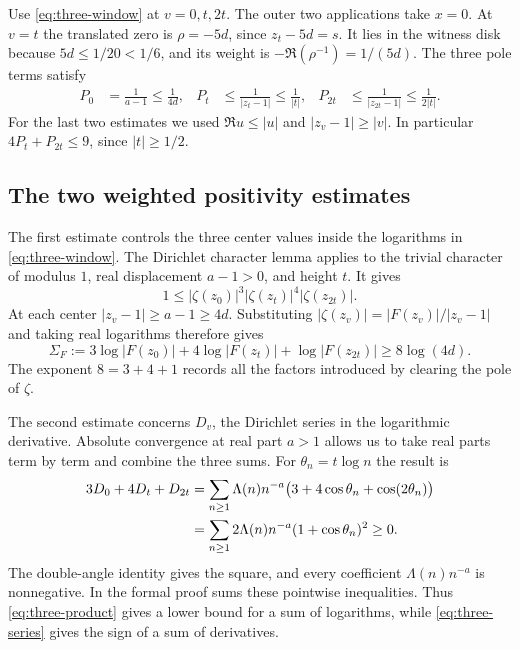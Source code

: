 Use \eqref{eq:three-window} at \(v=0,t,2t\). The outer two applications
take \(x=0\). At \(v=t\) the translated zero is \(\rho=-5d\), since
\(z_t-5d=s\). It lies in the witness disk because \(5d\le1/20<1/6\), and
its weight is \(-\Re(\rho^{-1})=1/(5d)\). The three pole terms satisfy
\begin{align}
 P_0&=\frac{1}{a-1}\le\frac{1}{4d},&
 P_t&\le\frac{1}{|z_t-1|}\le\frac{1}{|t|},&
 P_{2t}&\le\frac{1}{|z_{2t}-1|}\le\frac{1}{2|t|}.
 \label{eq:three-poles}
\end{align}
For the last two estimates we used \(\Re u\le |u|\) and
\(|z_v-1|\ge |v|\). In particular \(4P_t+P_{2t}\le9\), since
\(|t|\ge1/2\).

\subsection{The two weighted positivity estimates}

The first estimate controls the three center values inside the logarithms
in \eqref{eq:three-window}. The Dirichlet character lemma
 applies to the trivial character
of modulus \(1\), real displacement \(a-1>0\), and height \(t\). It gives
\[
       1\le |\zeta(z_0)|^3|\zeta(z_t)|^4|\zeta(z_{2t})|.
\]
At each center \(|z_v-1|\ge a-1\ge4d\).
Substituting \(|\zeta(z_v)|=|F(z_v)|/|z_v-1|\) and taking real
logarithms therefore gives
\begin{equation}
 \Sigma_F:=3\log|F(z_0)|+4\log|F(z_t)|+\log|F(z_{2t})|
             \ge 8\log(4d).
 \label{eq:three-product}
\end{equation}
The exponent \(8=3+4+1\) records all the factors introduced by clearing
the pole of \(\zeta\).

The second estimate concerns \(D_v\), the Dirichlet series in the
logarithmic derivative. Absolute convergence at real part \(a>1\) allows
us to take real parts term by term and combine the three sums. For
\(\theta_n=t\log n\) the result is
\begin{align}
 3D_0+4D_t+D_{2t}
   &=\sum_{n\ge1}\Lambda(n)n^{-a}
           \bigl(3+4\cos\theta_n+\cos(2\theta_n)\bigr)\notag\\
   &=\sum_{n\ge1}2\Lambda(n)n^{-a}(1+\cos\theta_n)^2\ge0 .
 \label{eq:three-series}
\end{align}
The double-angle identity gives the square, and every coefficient
\(\Lambda(n)n^{-a}\) is nonnegative. In the formal proof
 sums these pointwise inequalities.
Thus \eqref{eq:three-product} gives a lower bound for a sum of logarithms,
while \eqref{eq:three-series} gives the sign of a sum of derivatives.

